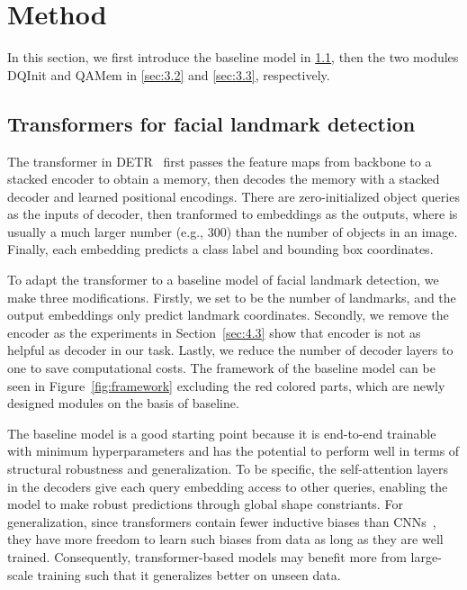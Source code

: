 \documentclass{article}
\begin{document}
\section{Method}
\label{sec:3}

In this section, we first introduce the baseline model in \ref{sec:3.1}, then the two modules DQInit and QAMem in \ref{sec:3.2} and \ref{sec:3.3}, respectively. 

\subsection{Transformers for facial landmark detection}
\label{sec:3.1}

The transformer in DETR~\citep{CMS20} first passes the feature maps from backbone to a stacked encoder to obtain a memory, then decodes the memory with a stacked decoder and learned positional encodings. There are  zero-initialized object queries as the inputs of decoder, then tranformed to  embeddings as the outputs, where  is usually a much larger number (e.g., 300) than the number of objects in an image. Finally, each embedding predicts a class label and bounding box coordinates.

To adapt the transformer to a baseline model of facial landmark detection, we make three modifications. Firstly, we set  to be the number of landmarks, and  the output embeddings only predict landmark coordinates. Secondly, we remove the encoder as the experiments in Section~\ref{sec:4.3} show that encoder is not as helpful as decoder in our task. Lastly, we reduce the number of decoder layers to one to save computational costs. The framework of the baseline model can be seen in Figure~\ref{fig:framework} excluding the red colored parts, which are newly designed modules on the basis of baseline.

The baseline model is a good starting point because it is end-to-end trainable with minimum hyperparameters and has the potential to perform well in terms of structural robustness and generalization. To be specific, the self-attention layers in the decoders give each query embedding access to other queries, enabling the model to make robust predictions through global shape constriants. For generalization, since transformers contain fewer inductive biases than CNNs~\citep{DBK21}, they have more freedom to learn such biases from data as long as they are well trained. Consequently, transformer-based models may benefit more from large-scale training such that it generalizes better on unseen data.
\end{document}
